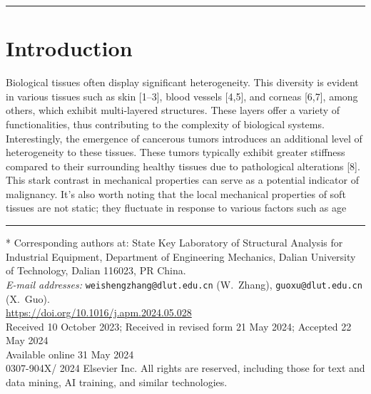 \documentclass[11pt]{article}
\begin{document}
\vspace{1.2em}
\hrule
\vspace{0.8em}

\section*{Introduction}

\noindent
Biological tissues often display significant heterogeneity. This
diversity is evident in various tissues such as skin [1--3], blood
vessels [4,5], and corneas [6,7], among others, which exhibit
multi-layered structures. These layers offer a variety of
functionalities, thus contributing to the complexity of biological
systems. Interestingly, the emergence of cancerous tumors introduces
an additional level of heterogeneity to these tissues. These tumors
typically exhibit greater stiffness compared to their surrounding
healthy tissues due to pathological alterations [8]. This stark
contrast in mechanical properties can serve as a potential indicator
of malignancy. It's also worth noting that the local mechanical
properties of soft tissues are not static; they fluctuate in response
to various factors such as age

\vfill
\hrule
\vspace{0.4em}
\noindent
{\footnotesize
* Corresponding authors at: State Key Laboratory of Structural
Analysis for Industrial Equipment, Department of Engineering
Mechanics, Dalian University of Technology, Dalian 116023, PR China.\\[2pt]
\textit{E-mail addresses:}
\texttt{weishengzhang@dlut.edu.cn} (W.~Zhang),
\texttt{guoxu@dlut.edu.cn} (X.~Guo).\\[4pt]
\url{https://doi.org/10.1016/j.apm.2024.05.028}\\[2pt]
Received 10 October 2023; Received in revised form 21 May 2024;
Accepted 22 May 2024\\[2pt]
Available online 31 May 2024\\[2pt]
0307-904X/\textcopyright{} 2024 Elsevier Inc. All rights are reserved,
including those for text and data mining, AI training, and similar
technologies.\par}
\end{document}
